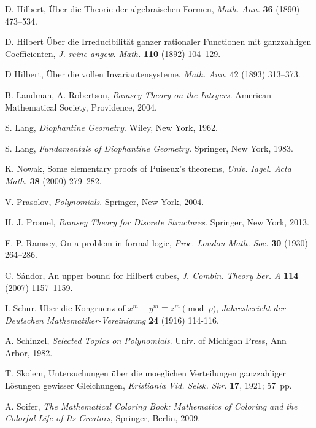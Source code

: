 \documentclass{article}
\theoremstyle{plain}
\theoremstyle{definition}
\begin{document}
\begin{thebibliography}{26}
D. Hilbert,
\"Uber die Theorie der algebraischen Formen,
\textit{Math. Ann.} \textbf{36} (1890) 473--534.

D. Hilbert
\"Uber die Irreducibilit\"at ganzer rationaler Functionen mit
ganzzahligen Coefficienten,
\textit{J. reine angew. Math.} \textbf{110} (1892) 104--129.

D Hilbert,
\"Uber die vollen Invariantensysteme.
\textit{Math. Ann.} 42 (1893) 313--373.

B. Landman, A. Robertson,
\textit{Ramsey Theory on the Integers}.
American Mathematical Society, Providence, 2004.

S. Lang,
\textit{Diophantine Geometry}.
Wiley, New York, 1962.

S. Lang,
\textit{Fundamentals of Diophantine Geometry}.
Springer, New York, 1983.

K. Nowak,
Some elementary proofs of Puiseux's theorems,
\textit{Univ. Iagel. Acta Math.} \textbf{38} (2000) 279--282.

V. Prasolov,
\textit{Polynomials}.
Springer, New York, 2004.

H. J. Promel,
\textit{Ramsey Theory for Discrete Structures}.
Springer, New York, 2013.

F. P. Ramsey,
On a problem in formal logic,
\textit{Proc. London Math. Soc.} \textbf{30} (1930) 264--286.

C. S\'andor,
An upper bound for Hilbert cubes,
\textit{J. Combin. Theory Ser. A} \textbf{114} (2007) 1157--1159.

I. Schur,
Uber die Kongruenz of $x^m+y^m\equiv z^m \pmod p$,
\textit{Jahresbericht der Deutschen Mathematiker-Vereinigung} \textbf{24} (1916) 114-116.






A. Schinzel,
\textit{Selected Topics on Polynomials}.
Univ. of Michigan Press, Ann Arbor, 1982.

T. Skolem,
Untersuchungen \"uber die moeglichen Verteilungen ganzzahliger
L\"osungen gewisser Gleichungen,
\textit{Kristiania Vid. Selsk. Skr.} \textbf{17}, 1921; 57~pp.

A. Soifer,
\textit{The Mathematical Coloring Book: Mathematics of Coloring
and the Colorful Life of Its Creators},
Springer, Berlin, 2009.


\end{thebibliography}
\end{document}
